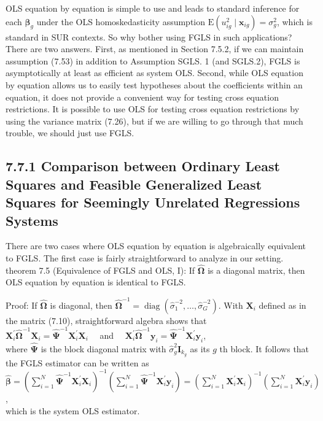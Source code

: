 \documentclass[10pt]{article}
\begin{document}
OLS equation by equation is simple to use and leads to standard inference for each $\boldsymbol{\beta}_{g}$ under the OLS homoskedasticity assumption $\mathrm{E}\left(u_{i g}^{2} \mid \mathbf{x}_{i g}\right)=\sigma_{g}^{2}$, which is standard in SUR contexts. So why bother using FGLS in such applications? There are two answers. First, as mentioned in Section 7.5.2, if we can maintain assumption (7.53) in addition to Assumption SGLS. 1 (and SGLS.2), FGLS is asymptotically at least as efficient as system OLS. Second, while OLS equation by equation allows us to easily test hypotheses about the coefficients within an equation, it does not provide a convenient way for testing cross equation restrictions. It is possible to use OLS for testing cross equation restrictions by using the variance matrix (7.26), but if we are willing to go through that much trouble, we should just use FGLS.

\subsection*{7.7.1 Comparison between Ordinary Least Squares and Feasible Generalized Least Squares for Seemingly Unrelated Regressions Systems}
There are two cases where OLS equation by equation is algebraically equivalent to FGLS. The first case is fairly straightforward to analyze in our setting.\\
theorem 7.5 (Equivalence of FGLS and OLS, I): If $\hat{\boldsymbol{\Omega}}$ is a diagonal matrix, then OLS equation by equation is identical to FGLS.

Proof: If $\hat{\boldsymbol{\Omega}}$ is diagonal, then $\hat{\boldsymbol{\Omega}}^{-1}=\operatorname{diag}\left(\hat{\sigma}_{1}^{-2}, \ldots, \hat{\sigma}_{G}^{-2}\right)$. With $\mathbf{X}_{i}$ defined as in the matrix (7.10), straightforward algebra shows that\\
$\mathbf{X}_{i}^{\prime} \hat{\boldsymbol{\Omega}}^{-1} \mathbf{X}_{i}=\hat{\boldsymbol{\Psi}}^{-1} \mathbf{X}_{i}^{\prime} \mathbf{X}_{i} \quad$ and $\quad \mathbf{X}_{i}^{\prime} \hat{\boldsymbol{\Omega}}^{-1} \mathbf{y}_{i}=\hat{\boldsymbol{\Psi}}^{-1} \mathbf{X}_{i}^{\prime} \mathbf{y}_{i}$,\\
where $\hat{\boldsymbol{\Psi}}$ is the block diagonal matrix with $\hat{\sigma}_{g}^{2} \mathbf{I}_{k_{g}}$ as its $g$ th block. It follows that the FGLS estimator can be written as\\
$\hat{\boldsymbol{\beta}}=\left(\sum_{i=1}^{N} \hat{\boldsymbol{\Psi}}^{-1} \mathbf{X}_{i}^{\prime} \mathbf{X}_{i}\right)^{-1}\left(\sum_{i=1}^{N} \hat{\boldsymbol{\Psi}}^{-1} \mathbf{X}_{i}^{\prime} \mathbf{y}_{i}\right)=\left(\sum_{i=1}^{N} \mathbf{X}_{i}^{\prime} \mathbf{X}_{i}\right)^{-1}\left(\sum_{i=1}^{N} \mathbf{X}_{i}^{\prime} \mathbf{y}_{i}\right)$,\\
which is the system OLS estimator.
\end{document}
